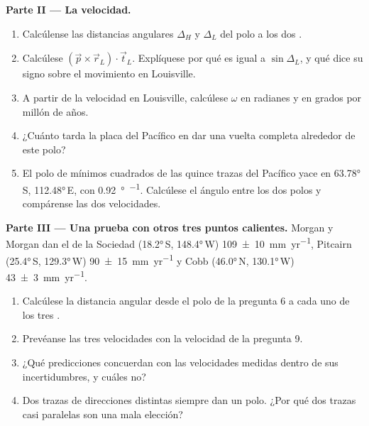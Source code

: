 \begin{problem}
\medskip
\noindent\textbf{Parte II --- La velocidad.}
\begin{enumerate}[resume]
  \item Calcúlense las distancias angulares $\Delta_H$ y $\Delta_L$ del polo a los dos .
  \item Calcúlese $(\vec p\times\vec r_L)\cdot\vec t_L$. Explíquese por qué es igual a $\sin\Delta_L$, y qué dice su signo sobre el movimiento en Louisville.
  \item A partir de la velocidad en Louisville, calcúlese $\omega$ en radianes y en grados por millón de años.
  \item ¿Cuánto tarda la placa del Pacífico en dar una vuelta completa alrededor de este polo?
  \item El polo de mínimos cuadrados de las quince trazas del Pacífico yace en \ang{63.78}\,S, \ang{112.48}\,E, con \qty{0.92}{\degree\per\Myr}. Calcúlese el ángulo
        entre los dos polos y compárense las dos velocidades.
\end{enumerate}

\medskip
\noindent\textbf{Parte III --- Una prueba con otros tres puntos calientes.} Morgan y Morgan dan el  de la Sociedad (\ang{18.2}\,S, \ang{148.4}\,W)
\qty[uncertainty-mode=separate]{109 \pm 10}{mm.yr^{-1}}, Pitcairn (\ang{25.4}\,S, \ang{129.3}\,W)
\qty[uncertainty-mode=separate]{90 \pm 15}{mm.yr^{-1}} y Cobb (\ang{46.0}\,N, \ang{130.1}\,W) \qty[uncertainty-mode=separate]{43 \pm 3}{mm.yr^{-1}}.
\begin{enumerate}[resume]
  \item Calcúlese la distancia angular desde el polo de la pregunta 6 a cada uno de los tres .
  \item Prevéanse las tres velocidades con la velocidad de la pregunta 9.
  \item ¿Qué predicciones concuerdan con las velocidades medidas dentro de sus incertidumbres, y cuáles no?
  \item Dos trazas de direcciones distintas siempre dan un polo. ¿Por qué dos trazas casi paralelas son una mala elección?
\end{enumerate}


\end{problem}
